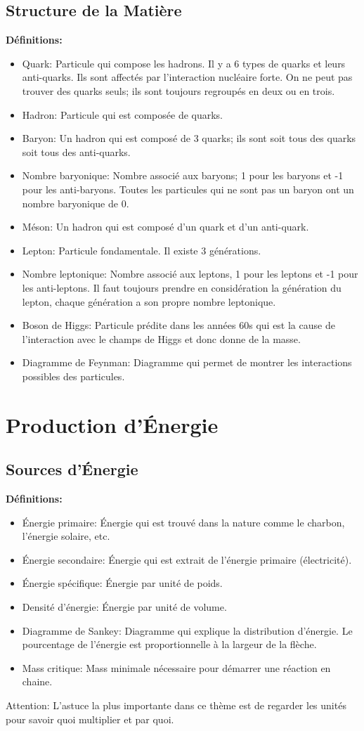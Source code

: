\documentclass[french, a4paper, 12pt]{article}
\begin{document}
\subsection{Structure de la Matière}
\textbf{Définitions:}
\begin{itemize}
\item Quark: Particule qui compose les hadrons. Il y a 6 types de quarks et leurs anti-quarks. Ils sont affectés par l'interaction nucléaire forte. On ne peut pas trouver des quarks seuls; ils sont toujours regroupés en deux ou en trois.
\item Hadron: Particule qui est composée de quarks.
\item Baryon: Un hadron qui est composé de 3 quarks; ils sont soit tous des quarks soit tous des anti-quarks.
\item Nombre baryonique: Nombre associé aux baryons; 1 pour les baryons et -1 pour les anti-baryons. Toutes les particules qui ne sont pas un baryon ont un nombre baryonique de 0.
\item Méson: Un hadron qui est composé d'un quark et d'un anti-quark.
\item Lepton: Particule fondamentale. Il existe 3 générations.
\item Nombre leptonique: Nombre associé aux leptons, 1 pour les leptons et -1 pour les anti-leptons. Il faut toujours prendre en considération la génération du lepton, chaque génération a son propre nombre leptonique.
\item Boson de Higgs: Particule prédite dans les années 60s qui est la cause de l'interaction avec le champs de Higgs et donc donne de la masse.
\item Diagramme de Feynman: Diagramme qui permet de montrer les interactions possibles des particules.
\end{itemize}
\pagebreak

\section{Production d'Énergie}
\subsection{Sources d'Énergie}
\textbf{Définitions:}
\begin{itemize}
\item Énergie primaire: Énergie qui est trouvé dans la nature comme le charbon, l'énergie solaire, etc.
\item Énergie secondaire: Énergie qui est extrait de l'énergie primaire (électricité).
\item Énergie spécifique: Énergie par unité de poids.
\item Densité d'énergie: Énergie par unité de volume.
\item Diagramme de Sankey: Diagramme qui explique la distribution d'énergie. Le pourcentage de l'énergie est proportionnelle à la largeur de la flèche.
\item Mass critique: Mass minimale nécessaire pour démarrer une réaction en chaine.
\end{itemize}
Attention: L'astuce la plus importante dans ce thème est de regarder les unités pour savoir quoi multiplier et par quoi.
\pagebreak
\end{document}

